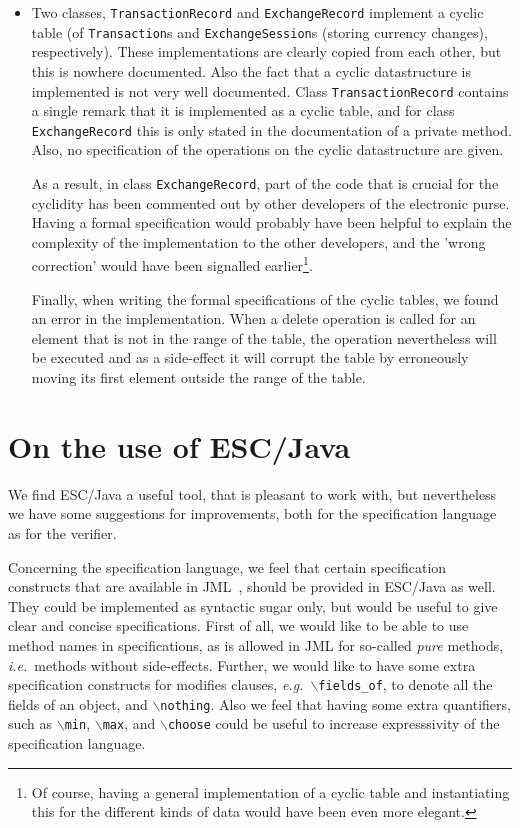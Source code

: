 \documentclass[a4paper]{llncs}
\newcommand{\noth}{\(\backslash\)\texttt{nothing}}
\newcommand{\fieldsof}{\(\backslash\)\texttt{fields\_of}}
\begin{document}
\begin{itemize}
\item Two classes, \texttt{TransactionRecord} and
\texttt{ExchangeRecord} implement a cyclic table (of
\texttt{Transaction}s and
\texttt{ExchangeSession}s (storing currency changes),
respectively).  These implementations are clearly copied from each
other, but this is nowhere documented. Also the fact that a
cyclic datastructure is implemented is not very well documented. Class
\texttt{TransactionRecord} contains a single remark that it is
implemented as a cyclic table, and for class
\texttt{ExchangeRecord} this is only stated in the documentation of a
private method. Also, no specification of the operations on the cyclic
datastructure are given.

As a result, in class \texttt{ExchangeRecord}, part of the code that
is crucial for the cyclidity has been commented out by other
developers of the electronic purse. Having a formal specification
would probably have been helpful to explain the complexity of the
implementation to the other developers, and the 'wrong correction'
would have been signalled earlier\footnote{Of course, having a general 
implementation of a cyclic table and instantiating this for the
different kinds of data would have been even more elegant.}.

Finally, when writing the formal specifications of the cyclic tables,
we found an error in the implementation. When a delete operation is
called for an element that is not in the range of the table, the
operation nevertheless will be executed and as a side-effect it will
corrupt the table by erroneously moving its first element outside the
range of the table.
\end{itemize}


\section{On the use of ESC/Java}
\label{SectESC}
We find ESC/Java a useful tool, that is pleasant to work with, but
nevertheless we have some suggestions for improvements, both for the
specification language as for the verifier.

Concerning the specification language, we feel that certain
specification constructs that are available in JML~\cite{LeavensBR99},
should be provided in ESC/Java as well. They could be implemented as
syntactic sugar only, but would be useful to give clear and concise
specifications.  First of all, we would like to be able to use method
names in specifications, as is allowed in JML for so-called
\emph{pure} methods, \emph{i.e.}~methods without
side-effects. Further, we would like to have some extra specification
constructs for modifies clauses, \emph{e.g.}~\fieldsof, to denote all
the fields of an object, and \noth. Also we feel that having some
extra quantifiers, such as \texttt{\(\backslash\)min},
\texttt{\(\backslash\)max}, and \texttt{\(\backslash\)choose} could be 
useful to increase expresssivity of the specification language.
\end{document}
